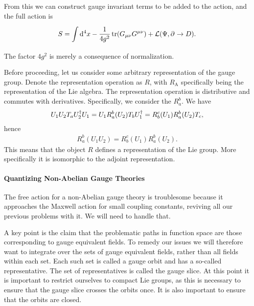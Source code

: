 From this we can construct gauge invariant terms to be added to the action, and the full action is
\begin{align*}
S = \int\limits_{}^{}\dd[4]{x}-\frac{1}{4g^{2}}\tr(G_{\mu\nu}G^{\mu\nu}) + \mathcal{L}(\Psi, \partial^{}_{}\to D).
\end{align*}
The factor $4g^{2}$ is merely a consequence of normalization.

Before proceeding, let us consider some arbitrary representation of the gauge group. Denote the representation operation as $R$, with $R_{\text{A}}$ specifically being the representation of the Lie algebra. The representation operation is distributive and commutes with derivatives. Specifically, we consider the $R_{a}^{b}$. We have
\begin{align*}
U_{1}U_{2}T_{a}U_{2}^{\dagger} U_{1} = U_{1}R_{a}^{b}(U_{2})T_{b}U_{1}^{\dagger} = R_{b}^{c}(U_{1})R_{a}^{b}(U_{2})T_{c},
\end{align*}
hence
\begin{align*}
R_{a}^{b}(U_{1}U_{2}) = R_{b}^{c}(U_{1})R_{a}^{b}(U_{2}).
\end{align*}
This means that the object $R$ defines a representation of the Lie group. More specifically it is isomorphic to the adjoint representation.

\paragraph{Quantizing Non-Abelian Gauge Theories}
The free action for a non-Abelian gauge theory is troublesome because it approaches the Maxwell action for small coupling constants, reviving all our previous problems with it. We will need to handle that.

A key point is the claim that the problematic paths in function space are those corresponding to gauge equivalent fields. To remedy our issues we will therefore want to integrate over the sets of gauge equivalent fields, rather than all fields within each set. Each such set is called a gauge orbit and has a so-called representative. The set of representatives is called the gauge slice. At this point it is important to restrict ourselves to compact Lie groups, as this is necessary to ensure that the gauge slice crosses the orbits once. It is also important to ensure that the orbits are closed.

